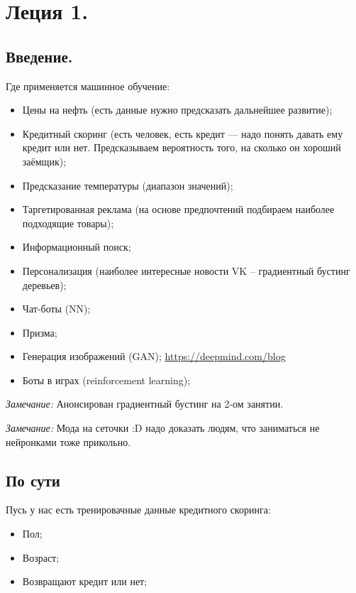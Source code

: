 \documentclass[a4paper,14pt]{article}
\begin{document}
    \tableofcontents

\newpage
\section{Леция 1.}
\subsection {Введение.}
Где применяется машинное обучение:
\begin{itemize}
    \item Цены на нефть (есть данные нужно предсказать дальнейшее развитие);
    \item Кредитный скоринг (есть человек, есть кредит --- надо понять давать ему кредит или нет. Предсказываем вероятность того, на сколько он хороший заёмщик);
    \item Предсказание температуры (диапазон значений);
    \item Таргетированная реклама (на основе предпочтений подбираем наиболее подходящие товары);
    \item Информационный поиск;
    \item Персонализация (наиболее интересные новости VK -- градиентный бустинг деревьев);
    \item Чат-боты (NN);
    \item Призма;
    \item Генерация изображений (GAN); \hyperlink{https://deepmind.com/blog}{https://deepmind.com/blog}
    \item Боты в играх (reinforcement learning);
\end{itemize}

{\it Замечание:} Анонсирован градиентный бустинг на 2-ом занятии.

{\it Замечание:} Мода на сеточки :D надо доказать людям, что заниматься не нейронками тоже прикольно.


\subsection{По сути}

Пусь у нас есть тренировачные данные кредитного скоринга:
\begin{itemize}
    \item Пол;
    \item Возраст;
    \item Возвращают кредит или нет;
\end{itemize} 
\end{document}
